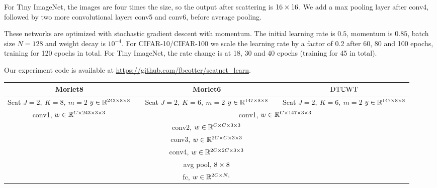 For Tiny ImageNet, the images are four times the size, so the output after
scattering is $16\x 16$. We add a max pooling layer after conv4, followed
by two more convolutional layers conv5 and conv6, before average pooling.

These networks are optimized with stochastic gradient descent with momentum. The
initial learning rate is $0.5$, momentum is $0.85$, batch size $N=128$ and
weight decay is $10^{-4}$. For CIFAR-10/CIFAR-100 we scale the learning rate by
a factor of 0.2 after 60, 80 and 100 epochs, training for 120 epochs in total.
For Tiny ImageNet, the rate change is at 18, 30 and 40 epochs (training for 45 in total).

Our experiment code is available at \url{https://github.com/fbcotter/scatnet_learn}.

\begin{table}
  \renewcommand{\arraystretch}{1.4}
  \centering
  \begin{tabular}{clclc}
    \toprule
    Morlet8 &\phantom{ab}& Morlet6 &\phantom{ab}& $\DTCWT$ \\\midrule
    \makecell{Scat \\ $J=2,\ K=8,\ m=2$ \\$y\in \reals[243\x8\x8]$} &&
    \makecell{Scat\\ $J=2,\ K=6,\ m=2$ \\$y\in \reals[147\x8\x8]$} &&
    \makecell{Scat\\ $J=2,\ K=6,\ m=2$ \\$y\in \reals[147\x8\x8]$} \\\cmidrule{1-1}\cmidrule{3-5}
    conv1, $w \in \reals[C\x 243\x 3\x 3]$ && \multicolumn{3}{c}{conv1, $w \in
    \reals[C\x 147\x 3\x 3]$} \\\midrule
    \multicolumn{5}{c}{conv2, $w\in \reals[C\x C\x 3\x 3]$}\\
    \multicolumn{5}{c}{conv3, $w\in \reals[2C\x C\x 3\x 3]$}\\
    \multicolumn{5}{c}{conv4, $w\in \reals[2C\x 2C\x 3\x 3]$}\\
    \multicolumn{5}{c}{avg pool, $8\x 8$}\\
    \multicolumn{5}{c}{fc, $w\in \reals[2C\x N_c]$} \\\bottomrule
  \end{tabular}\label{tab:ch3:scat_arch}
\end{table}

